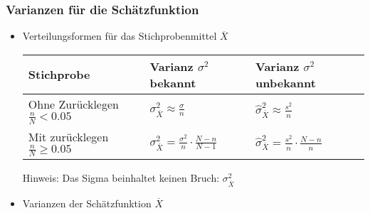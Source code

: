 \subsubsection{Varianzen für die Schätzfunktion}
\begin{itemize}
\item Verteilungsformen für das Stichprobenmittel $\overline{X}$
\begin{table}[h]
\centering
\begin{tabular}{@{}lll@{}}
\toprule
Stichprobe & Varianz $\sigma^2$ bekannt & Varianz $\sigma^2$ unbekannt \\ \midrule
Ohne Zurücklegen $\frac{n}{N}<0.05$ & $\displaystyle\sigma_{\overline{X}}^2\approx\frac{\sigma}{n}$ & $\displaystyle\widehat{\sigma}_{\overline{X}}^2\approx\frac{s^2}{n}$ \\ 
Mit zurücklegen $\frac{n}{N} \geq 0.05$ & $\displaystyle\sigma_{\overline{X}}^2=\frac{\sigma^2}{n}\cdot\frac{N-n}{N-1}$ & $\displaystyle\widehat{\sigma}_{\overline{X}}^2 =\frac{s^2}{n}\cdot\frac{N-n}{n}$ \\ \bottomrule
\end{tabular}
\end{table}
Hinweis: Das Sigma beinhaltet keinen Bruch: $\sigma_{\overline{X}}^2$
\item Varianzen der Schätzfunktion $\overline{X}$
\newpage

\end{itemize}
